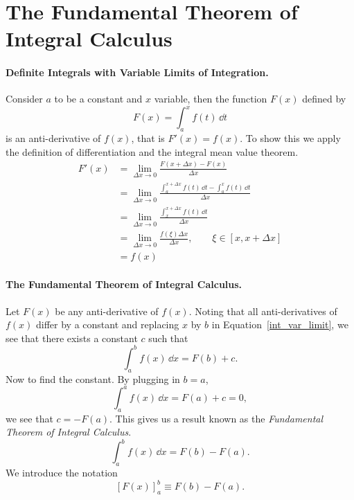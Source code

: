 \section{The Fundamental Theorem of Integral Calculus}


\paragraph{Definite Integrals with Variable Limits of Integration.}
Consider $a$ to be a constant and $x$ variable, then the function $F(x)$
defined by
\begin{equation}
  \label{int_var_limit}
  F(x) = \int_a^x f(t) \,\dd t
\end{equation}
is an anti-derivative of $f(x)$, that is $F'(x) = f(x)$.  To show this
we apply the definition of differentiation and the integral mean value
theorem.
\begin{align*}
  F'(x)
  &= \lim_{\Delta x \to 0} \frac{F(x+\Delta x) - F(x)}{\Delta x} \\
  &= \lim_{\Delta x \to 0} \frac{ \int_a^{x+\Delta x} f(t) \,\dd t
    - \int_a^x f(t)\,\dd t }{\Delta x} \\
  &= \lim_{\Delta x \to 0} \frac{ \int_x^{x+\Delta x} f(t) \,\dd t }
  {\Delta x} \\
  &= \lim_{\Delta x \to 0} \frac{ f(\xi) \Delta x }
  {\Delta x}, \qquad \xi \in [x,x+\Delta x] \\
  &= f(x)
\end{align*}




\paragraph{The Fundamental Theorem of Integral Calculus.}
Let $F(x)$ be any anti-derivative of $f(x)$.  Noting that all anti-derivatives
of $f(x)$ differ by a constant and replacing $x$ by $b$ in 
Equation~\ref{int_var_limit}, we see that there exists a constant $c$ 
such that
\[
\int_a^b f(x) \,\dd x = F(b) + c.
\]
Now to find the constant.  By plugging in $b = a$,
\[
\int_a^a f(x) \,\dd x = F(a) + c = 0,
\]
we see that $c = -F(a)$.  This gives us a result known as the 
\textit{Fundamental Theorem of Integral Calculus}.
\[
\int_a^b f(x) \,\dd x = F(b) - F(a).
\]
We introduce the notation
\[
[F(x)]_a^b \equiv F(b) - F(a).
\]



